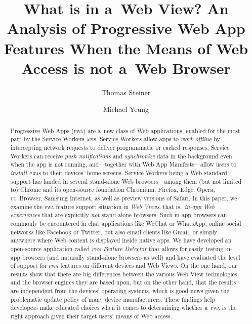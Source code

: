 \documentclass[sigconf]{acmart}
\begin{document}
\title[What is in a~Web View?]{What is in a~Web View?
An Analysis of Progressive Web App Features
When the Means of Web Access is not a~Web Browser}  



\author{Thomas Steiner}

\author{Michael Yeung}


\begin{abstract}
Progressive Web Apps (\textsc{pwa}) are a~new class of Web applications,
enabled for the most part by the Service Workers \textsc{api}s.
Service Workers allow apps to \emph{work offline}
by intercepting network requests to deliver programmatic or cached responses,
Service Workers can receive \emph{push notifications}
and \emph{synchronize} data in the background
even when the app is not running,
and---together with Web App Manifests---allow users to \emph{install \textsc{pwa}s}
to their devices' home screens.
Service Workers being a Web standard, support has landed in several
stand-alone Web browsers---among them (but not limited to)
Chrome and its open-source foundation Chromium, Firefox, Edge, Opera,
\textsc{uc}~Browser, Samsung Internet, as well as preview versions of Safari.
In this paper, we examine the \textsc{pwa} feature support situation in \emph{Web Views},
that is,\ \emph{in-app Web experiences} that are explicitly \emph{not} stand-alone browsers.
Such in-app browsers can commonly be encountered in chat applications like WeChat or WhatsApp,
online social networks like Facebook or Twitter, but also email clients like Gmail,
or simply anywhere where Web content is displayed inside native apps.
We have developed an open-source application called \emph{\textsc{pwa} Feature Detector}
that allows for easily testing in-app browsers (and naturally stand-alone browsers as well)
and have evaluated the level of support for \textsc{pwa} features
on different devices and Web Views.
On the one hand, our results show that there are big differences
between the various Web View technologies
and the browser engines they are based upon,
but on the other hand, that the results
are independent from the devices' operating systems,
which is good news given the problematic update policy of many device manufacturers.
These findings help developers make educated choices when it comes to determining
whether a~\textsc{pwa} is the right approach given their target users' means of Web access.
\end{abstract}
\end{document}
